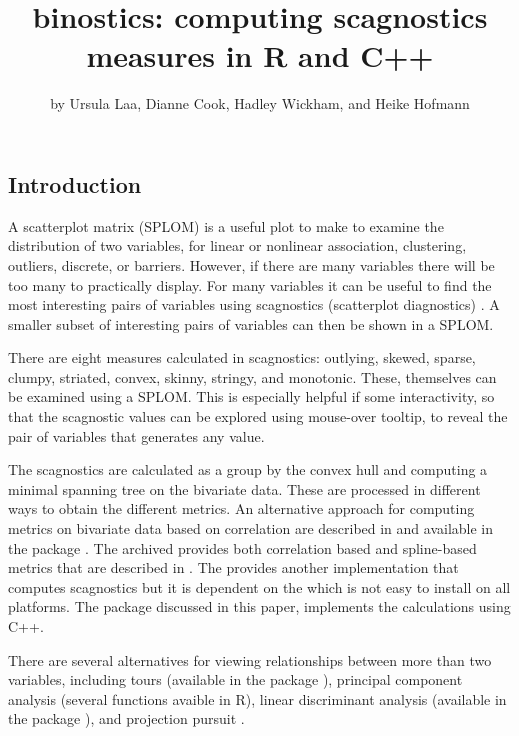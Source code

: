 \title{binostics: computing scagnostics measures in R and C++}
\author{by Ursula Laa, Dianne Cook, Hadley Wickham, and Heike Hofmann}

\maketitle


\hypertarget{introduction}{%
\subsection{Introduction}\label{introduction}}

A scatterplot matrix (SPLOM) is a useful plot to make to examine the
distribution of two variables, for linear or nonlinear association,
clustering, outliers, discrete, or barriers. However, if there are many
variables there will be too many to practically display. For many
variables it can be useful to find the most interesting pairs of
variables using scagnostics (scatterplot diagnostics)
\citep[\citet{WW08}]{scag}. A smaller subset of interesting pairs of
variables can then be shown in a SPLOM.

There are eight measures calculated in scagnostics: outlying, skewed,
sparse, clumpy, striated, convex, skinny, stringy, and monotonic. These,
themselves can be examined using a SPLOM. This is especially helpful if
some interactivity, so that the scagnostic values can be explored using
mouse-over tooltip, to reveal the pair of variables that generates any
value.

The scagnostics are calculated as a group by the convex hull and
computing a minimal spanning tree on the bivariate data. These are
processed in different ways to obtain the different metrics. An
alternative approach for computing metrics on bivariate data based on
correlation are described in \citet{Reshef1518} and available in the
 package \citep{minerva}. The archived
 \citep{mbgraphic} provides both correlation based
and spline-based metrics that are described in \citep{Grimm2016}. The
 \citep{LWscagR} provides another implementation
that computes scagnostics but it is dependent on the 
which is not easy to install on all platforms. The 
package discussed in this paper, implements the calculations using C++.

There are several alternatives for viewing relationships between more
than two variables, including tours \citep{As85} (available in the
 package \citep{tourr}), principal component analysis
(several functions avaible in R), linear discriminant analysis
(available in the package \citep{MASS}), and projection
pursuit \citep{f87}.

